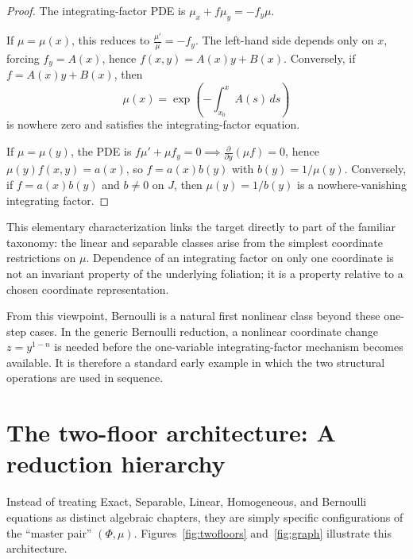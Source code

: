 \documentclass[11pt]{article}
\theoremstyle{definition}
\begin{document}
\begin{proof}
The integrating-factor PDE is \(\mu_x+f\mu_y=-f_y\mu\). 

If \(\mu=\mu(x)\), this reduces to \(\frac{\mu'}{\mu}=-f_y\). The left-hand side depends only on \(x\), forcing \(f_y=A(x)\), hence \(f(x,y)=A(x)y+B(x)\). Conversely, if \(f=A(x)y+B(x)\), then
\[
\mu(x)=\exp\!\left(-\int_{x_0}^{x}A(s)\,ds\right)
\]
is nowhere zero and satisfies the integrating-factor equation.

If \(\mu=\mu(y)\), the PDE is \(f\mu'+\mu f_y=0 \implies \frac{\partial}{\partial y}(\mu f)=0\), hence \(\mu(y)f(x,y)=a(x)\), so \(f=a(x)b(y)\) with \(b(y)=1/\mu(y)\). Conversely, if \(f=a(x)b(y)\) and \(b\neq0\) on \(J\), then \(\mu(y)=1/b(y)\) is a nowhere-vanishing integrating factor.
\end{proof}

This elementary characterization links the target directly to part of the familiar taxonomy: the linear and separable classes arise from the simplest coordinate restrictions on \(\mu\). Dependence of an integrating factor on only one coordinate is not an invariant property of the underlying foliation; it is a property relative to a chosen coordinate representation.

From this viewpoint, Bernoulli is a natural first nonlinear class beyond these one-step cases. In the generic Bernoulli reduction, a nonlinear coordinate change \(z=y^{1-n}\) is needed before the one-variable integrating-factor mechanism becomes available. It is therefore a standard early example in which the two structural operations are used in sequence.

\section{The two-floor architecture: A reduction hierarchy}

Instead of treating Exact, Separable, Linear, Homogeneous, and Bernoulli equations as distinct algebraic chapters, they are simply specific configurations of the ``master pair'' \((\Phi, \mu)\). Figures~\ref{fig:twofloors} and~\ref{fig:graph} illustrate this architecture.
\end{document}

